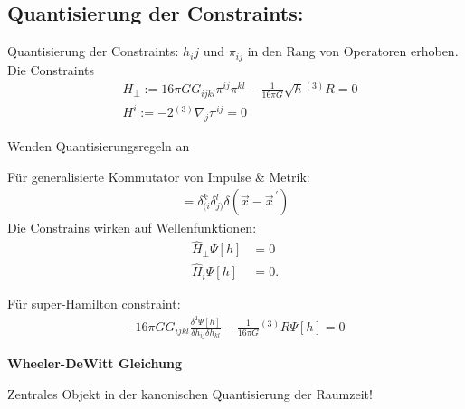 \documentclass[mathserif]{beamer}
\newcommand{\inHS}{{}^{(3)}\!}
\theoremstyle{definition}
\begin{document}
\subsection{Quantisierung der Constraints:}
	\begin{frame}{Quantisierung der Constraints:}
		$h_ij$ und $\pi_{ij}$ in den Rang von Operatoren erhoben.
		\pause
		Die Constraints 
		\begin{align}
			&H_{\perp}:=16\pi G G_{ijkl}\pi^{ij}\pi^{kl}-\frac{1}{16\pi G}\sqrt{h}\inHS R=0 \label{equ:constraint1}\\
			&H^i:=-2\inHS\nabla_j\pi^{ij}=0 \label{equ:constraint2}
		\end{align}
		\pause
		\begin{center}
			Wenden Quantisierungsregeln an
		\end{center}
		\pause
		Für generalisierte Kommutator von Impulse \& Metrik:
		\begin{align}
			[h_{ij}(\vec{x}),\pi^{kl}(\vec{x}^{\,\prime})]=\delta^k_{(i}\delta^l_{j)}\delta(\vec{x}-\vec{x}^{\,\prime})
		\end{align}
		\pause
		Die Constrains wirken auf Wellenfunktionen:
		\begin{align}
			\hat{H}_\perp\Psi[h]&=0\\
			\hat{H}_i\Psi[h]&=0.
		\end{align}
	\end{frame}
	\begin{frame}
		Für super-Hamilton constraint:
		\begin{align}
			\boxed{-16\pi G G_{ijkl}\frac{\delta^2\Psi[h]}{\delta h_{ij}\delta h_{kl}}-\frac{1}{16\pi G}\inHS R\Psi[h]=0}
		\end{align}
		\begin{center}
			\textbf{Wheeler-DeWitt Gleichung}
		\end{center}
		\pause
		Zentrales Objekt in der kanonischen Quantisierung der Raumzeit!
	\end{frame}
\end{document}
